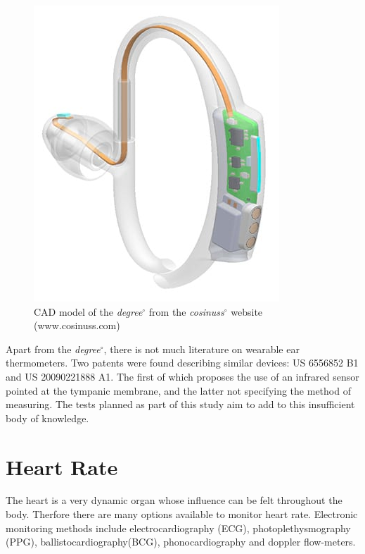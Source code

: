 \medskip

\begin{figure}[h]
   \centering
   \includegraphics[scale=0.5]{figs/Degree}
   \caption{CAD model of the \textit{degree}$^{\circ}$ from the \textit{cosinuss}$^{\circ}$ website (www.cosinuss.com)}
   \label{fig:Degree}
\end{figure}

Apart from the \textit{degree}$^{\circ}$, there is not much literature on wearable ear thermometers. Two patents were found describing similar devices: US 6556852 B1 and US 20090221888 A1. The first of which proposes the use of an infrared sensor pointed at the tympanic membrane, and the latter not specifying the method of measuring. The tests planned as part of this study aim to add to this insufficient body of knowledge.

\section{Heart Rate}
The heart is a very dynamic organ whose influence can be felt throughout the body. Therfore there are many options available to monitor heart rate. Electronic monitoring methods include electrocardiography (ECG), photoplethysmography (PPG), ballistocardiography(BCG), phonocardiography and doppler flow-meters.

